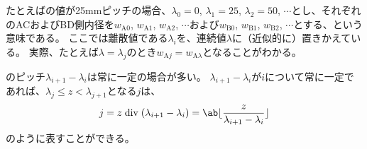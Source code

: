 \begin{hosoku}[label=hosoku:example4taper]
たとえば\IDTaperTable の値が25mmピッチの場合、$\lambda_0=0$, $\lambda_1=25$, $\lambda_2=50$, $\cdots$とし、それぞれのACおよびBD側内径を$w_{\mathrm A0}$, $w_{\mathrm A1}$, $w_{\mathrm A2}$, $\cdots$および$w_{\mathrm B0}$, $w_{\mathrm B1}$, $w_{\mathrm B2}$, $\cdots$とする、という意味である。
ここでは離散値である$\lambda_i$を、連続値$\lambda$に（近似的に）置きかえている。
実際、たとえば$\lambda = \lambda_j$のとき$w_{\mathrm Aj} = w_{\mathrm A\lambda}$となることがわかる。
\end{hosoku}\relax
\begin{hosoku}
\IDTaperTable のピッチ$\lambda_{i+1}-\lambda_i$は常に一定の場合が多い。
$\lambda_{i+1}-\lambda_i$が$i$について常に一定であれば、$\lambda_j \leq z < \lambda_{j+1}$となる$j$は、
\begin{align*}
  j = z \bDiv (\lambda_{i+1}-\lambda_i) = \ab\lfloor\frac z{\lambda_{i+1}-\lambda_i}\rfloor
\end{align*}
のように表すことができる。
\end{hosoku}
\vfill
